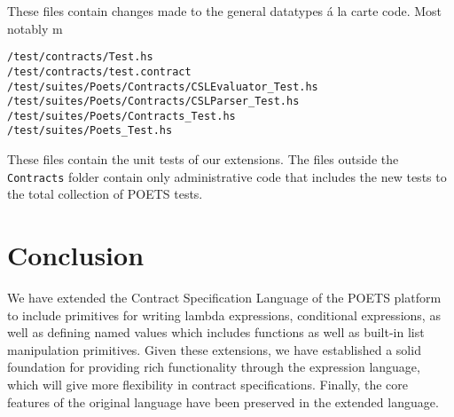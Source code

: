 \documentclass[10pt,a4paper,final,oneside,openany,article]{memoir}
\begin{document}
These files contain changes made to the general datatypes á la carte code.
Most notably m

\begin{verbatim}
/test/contracts/Test.hs
/test/contracts/test.contract
/test/suites/Poets/Contracts/CSLEvaluator_Test.hs
/test/suites/Poets/Contracts/CSLParser_Test.hs
/test/suites/Poets/Contracts_Test.hs
/test/suites/Poets_Test.hs
\end{verbatim}

These files contain the unit tests of our extensions. The files
outside the \verb+Contracts+ folder contain only administrative code
that includes the new tests to the total collection of POETS tests.

\chapter{Conclusion}
We have extended the Contract Specification Language of the POETS
platform to include primitives for writing lambda expressions,
conditional expressions, as well as defining named values which includes
functions as well as built-in list manipulation primitives. Given these
extensions, we have established a solid foundation for providing rich
functionality through the expression language, which will give more
flexibility in contract specifications.
Finally, the core features of the original language \cite[page
4]{hvitved10} have been preserved in the extended language.

\end{document}
